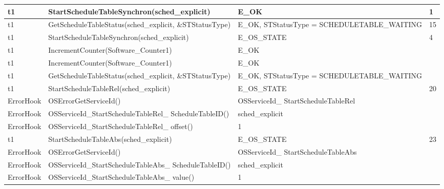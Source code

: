 \documentclass[10pt]{article}
\newlength{\Li}\settowidth{\Li}{Running}
\newlength{\Lii}\setlength{\Lii}{7cm}
\newlength{\Liiii}\setlength{\Liiii}{0.9cm}
\newlength{\Liii}\setlength{\Liii}{\textwidth} \addtolength{\Liii}{-\Li} \addtolength{\Liii}{-\Lii} \addtolength{\Liii}{-\Liiii}
\begin{document}
	\begin{supertabular}{|p{\Li}|p{\Lii}|p{\Liii}|p{\Liiii}|} \hline 
	t1		& StartScheduleTableSynchron(sched\_explicit)					& E\_OK																	& 1 \\ \hline
	t1		& GetScheduleTableStatus(sched\_explicit, \&STStatusType)			& E\_OK, STStatusType = SCHEDULETABLE\_WAITING								& 15 \\ \hline
	t1		& StartScheduleTableSynchron(sched\_explicit)					& E\_OS\_STATE															& 4 \\ \hline
	t1		& IncrementCounter(Software\_Counter1)						& E\_OK																	& \\ \hline
	t1		& IncrementCounter(Software\_Counter1)						& E\_OK																	& \\ \hline
	t1		& GetScheduleTableStatus(sched\_explicit, \&STStatusType)			& E\_OK, STStatusType = SCHEDULETABLE\_WAITING								& \\ \hline
	t1		& StartScheduleTableRel(sched\_explicit)						& E\_OS\_STATE															& 20 \\ \hline
	ErrorHook	& OSErrorGetServiceId()										& OSServiceId\_ StartScheduleTableRel											& \\ \hline
	ErrorHook	& OSServiceId\_StartScheduleTableRel\_ ScheduleTableID()			& sched\_explicit															& \\ \hline
	ErrorHook	& OSServiceId\_StartScheduleTableRel\_ offset()					& 1																		& \\ \hline
	t1		& StartScheduleTableAbs(sched\_explicit)						& E\_OS\_STATE															& 23 \\ \hline
	ErrorHook	& OSErrorGetServiceId()										& OSServiceId\_ StartScheduleTableAbs											& \\ \hline
	ErrorHook	& OSServiceId\_StartScheduleTableAbs\_ ScheduleTableID()			& sched\_explicit															& \\ \hline
	ErrorHook	& OSServiceId\_StartScheduleTableAbs\_ value()					& 1																		& \\ \hline
	

\end{supertabular}
\end{document}
